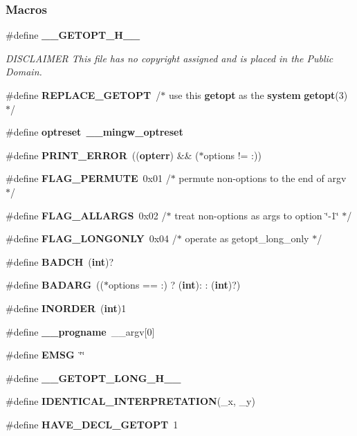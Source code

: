 \subsubsection*{Macros}
\begin{DoxyCompactItemize}
\item 
\#define {\bf \+\_\+\+\_\+\+G\+E\+T\+O\+P\+T\+\_\+\+H\+\_\+\+\_\+}
\begin{DoxyCompactList}\small\item\em D\+I\+S\+C\+L\+A\+I\+M\+ER This file has no copyright assigned and is placed in the Public Domain. \end{DoxyCompactList}\item 
\#define {\bf R\+E\+P\+L\+A\+C\+E\+\_\+\+G\+E\+T\+O\+PT}~/$\ast$ use this {\bf getopt} as the {\bf system} {\bf getopt}(3) $\ast$/
\item 
\#define {\bf optreset}~{\bf \+\_\+\+\_\+mingw\+\_\+optreset}
\item 
\#define {\bf P\+R\+I\+N\+T\+\_\+\+E\+R\+R\+OR}~(({\bf opterr}) \&\& ($\ast$options != \textquotesingle{}\+:\textquotesingle{}))
\item 
\#define {\bf F\+L\+A\+G\+\_\+\+P\+E\+R\+M\+U\+TE}~0x01	/$\ast$ permute non-\/options to the end of argv $\ast$/
\item 
\#define {\bf F\+L\+A\+G\+\_\+\+A\+L\+L\+A\+R\+GS}~0x02	/$\ast$ treat non-\/options as args to option \char`\"{}-\/1\char`\"{} $\ast$/
\item 
\#define {\bf F\+L\+A\+G\+\_\+\+L\+O\+N\+G\+O\+N\+LY}~0x04	/$\ast$ operate as getopt\+\_\+long\+\_\+only $\ast$/
\item 
\#define {\bf B\+A\+D\+CH}~({\bf int})\textquotesingle{}?\textquotesingle{}
\item 
\#define {\bf B\+A\+D\+A\+RG}~(($\ast$options == \textquotesingle{}\+:\textquotesingle{}) ? ({\bf int})\textquotesingle{}\+:\textquotesingle{} \+: ({\bf int})\textquotesingle{}?\textquotesingle{})
\item 
\#define {\bf I\+N\+O\+R\+D\+ER}~({\bf int})1
\item 
\#define {\bf \+\_\+\+\_\+progname}~\+\_\+\+\_\+argv[0]
\item 
\#define {\bf E\+M\+SG}~\char`\"{}\char`\"{}
\item 
\#define {\bf \+\_\+\+\_\+\+G\+E\+T\+O\+P\+T\+\_\+\+L\+O\+N\+G\+\_\+\+H\+\_\+\+\_\+}
\item 
\#define {\bf I\+D\+E\+N\+T\+I\+C\+A\+L\+\_\+\+I\+N\+T\+E\+R\+P\+R\+E\+T\+A\+T\+I\+ON}(\+\_\+x,  \+\_\+y)
\item 
\#define {\bf H\+A\+V\+E\+\_\+\+D\+E\+C\+L\+\_\+\+G\+E\+T\+O\+PT}~1
\end{DoxyCompactItemize}
